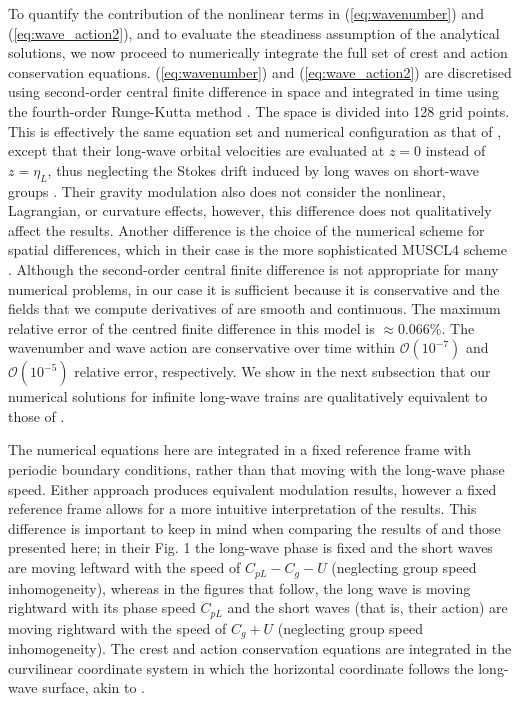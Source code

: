 \documentclass[lineno]{jfm}
\begin{document}
To quantify the contribution of the nonlinear terms in (\ref{eq:wavenumber})
and (\ref{eq:wave_action2}), and to evaluate the steadiness assumption of the
analytical solutions, we now proceed to numerically integrate the full set of
crest and action conservation equations.
(\ref{eq:wavenumber}) and (\ref{eq:wave_action2}) are discretised using
second-order central finite difference in space and integrated in time using the
fourth-order Runge-Kutta method \citep{butcher1996runge}.
The space is divided into 128 grid points.
This is effectively the same equation set and numerical configuration as that of
\citet{peureux2021unsteady}, except that their long-wave orbital velocities are
evaluated at $z=0$ instead of $z=\eta_L$, thus neglecting the Stokes drift
induced by long waves on short-wave groups
\citep{stokes1847,van2018stokes,monismith2020stokes}.
Their gravity modulation also does not consider the nonlinear, Lagrangian, or
curvature effects, however, this difference does not qualitatively affect the results.
Another difference is the choice of the numerical scheme for spatial differences,
which in their case is the more sophisticated MUSCL4 scheme \citep{kurganov2000new}.
Although the second-order central finite difference is not appropriate for many
numerical problems, in our case it is sufficient because it is conservative and
the fields that we compute derivatives of are smooth and continuous.
The maximum relative error of the centred finite difference in this model
is $\approx 0.066\%$.
The wavenumber and wave action are conservative over time within
$\mathcal{O}(10^{-7})$ and $\mathcal{O}(10^{-5})$ relative error, respectively.
We show in the next subsection that our numerical solutions for infinite long-wave
trains are qualitatively equivalent to those of \citet{peureux2021unsteady}.

The numerical equations here are integrated in a fixed reference frame with
periodic boundary conditions, rather than that moving with the long-wave phase speed.
Either approach produces equivalent modulation results, however a fixed
reference frame allows for a more intuitive interpretation of the results.
This difference is important to keep in mind when comparing the results
of \citet{peureux2021unsteady} and those presented here; in their Fig. 1 the
long-wave phase is fixed and the short waves are moving leftward
with the speed of $C_{pL} - C_g - U$ (neglecting group speed inhomogeneity),
whereas in the figures that follow, the long wave is moving rightward with its
phase speed $C_{pL}$ and the short waves (that is, their action) are moving
rightward with the speed of $C_g + U$ (neglecting group speed inhomogeneity).
The crest and action conservation equations are integrated in the curvilinear
coordinate system in which the horizontal coordinate follows the long-wave
surface, akin to \citet{zhang1990evolution}.
\end{document}
